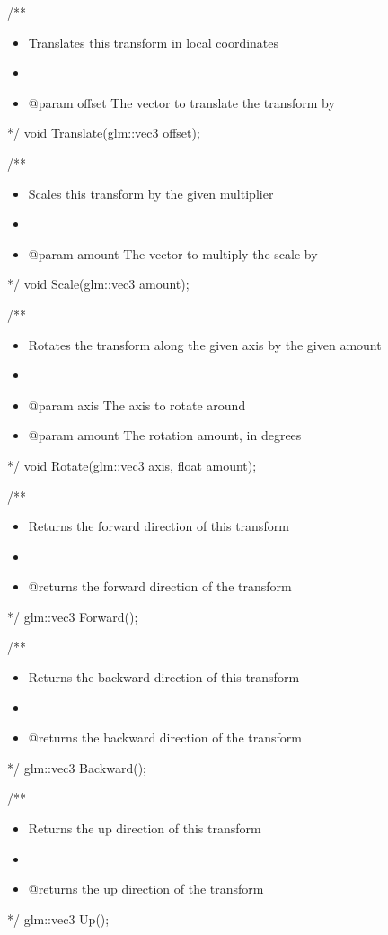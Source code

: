 \documentclass[11pt]{article}
\begin{document}
/**
\begin{itemize}
\item Translates this transform in local coordinates
\item 

\item @param offset The vector to translate the transform by
\end{itemize}
 */
void Translate(glm::vec3 offset);


/**
\begin{itemize}
\item Scales this transform by the given multiplier
\item 

\item @param amount The vector to multiply the scale by
\end{itemize}
 */
void Scale(glm::vec3 amount);

/**
\begin{itemize}
\item Rotates the transform along the given axis by the given amount
\item 

\item @param axis The axis to rotate around
\item @param amount The rotation amount, in degrees
\end{itemize}
 */
void Rotate(glm::vec3 axis, float amount);

/**
\begin{itemize}
\item Returns the forward direction of this transform
\item 

\item @returns the forward direction of the transform
\end{itemize}
 */
glm::vec3 Forward();

/**
\begin{itemize}
\item Returns the backward direction of this transform
\item 

\item @returns the backward direction of the transform
\end{itemize}
 */ 
glm::vec3 Backward();

/**
\begin{itemize}
\item Returns the up direction of this transform
\item 

\item @returns the up direction of the transform
\end{itemize}
 */
glm::vec3 Up();
\end{document}
